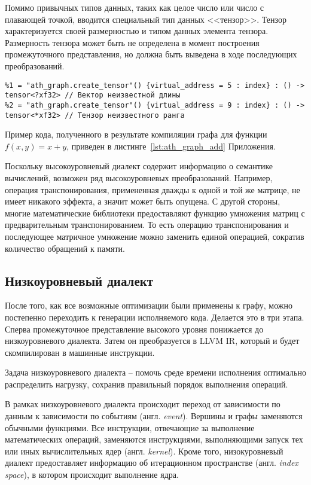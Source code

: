 Помимо привычных типов данных, таких как целое число или число с плавающей
точкой, вводится специальный тип данных <<тензор>>. Тензор характеризуется
своей размерностью и типом данных элемента тензора. Размерность тензора может
быть не определена в момент построения промежуточного представления, но должна
быть выведена в ходе последующих преобразований.

\begin{lstlisting}[language=athgraph,caption=Различные варианты тензоров]
%0 = "ath_graph.create_tensor"() {virtual_address = 1 : index} : () -> tensor<2x2xf32> // Матрица 2x2
%1 = "ath_graph.create_tensor"() {virtual_address = 5 : index} : () -> tensor<?xf32> // Вектор неизвестной длины
%2 = "ath_graph.create_tensor"() {virtual_address = 9 : index} : () -> tensor<*xf32> // Тензор неизвестного ранга
\end{lstlisting}

Пример кода, полученного в результате компиляции графа для функции 
$f(x, y) = x + y$, приведен в листинге~\ref{lst:ath_graph_add} Приложения.

Поскольку высокоуровневый диалект содержит информацию о семантике вычислений,
возможен ряд высокоуровневых преобразований. Например, операция транспонирования,
примененная дважды к одной и той же матрице, не имеет никакого эффекта, а значит
может быть опущена. С другой стороны, многие математические библиотеки
предоставляют функцию умножения матриц с предварительным транспонированием.
То есть операцию транспонирования и последующее матричное умножение можно
заменить единой операцией, сократив количество обращений к памяти.

\subsection{Низкоуровневый диалект}

После того, как все возможные оптимизации были применены к графу, можно
постепенно переходить к генерации исполняемого кода. Делается это в три этапа.
Сперва промежуточное представление высокого уровня понижается до низкоуровневого
диалекта. Затем он преобразуется в LLVM IR, который и будет скомпилирован
в машинные инструкции.

Задача низкоуровневого диалекта -- помочь среде времени исполнения оптимально
распределить нагрузку, сохранив правильный порядок выполнения операций.

В рамках низкоуровневого диалекта происходит переход от зависимости по данным
к зависимости по событиям (англ. \textit{event}). Вершины и графы заменяются 
обычными функциями. Все инструкции, отвечающие за выполнение математических 
операций, заменяются инструкциями, выполняющими запуск тех или иных 
вычислительных ядер (англ. \textit{kernel}). Кроме того, низокуровневый диалект
предоставляет информацию об итерационном пространстве
(англ. \textit{index space}), в котором происходит выполнение ядра.

